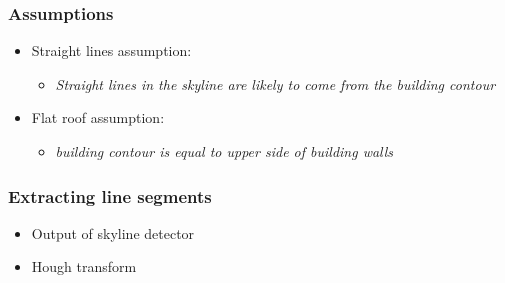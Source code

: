 \documentclass{beamer}
\begin{document}
\frame
{
	\frametitle{Assumptions}
	\begin{itemize}
		\item Straight lines assumption:
		\begin{itemize}
		\item \emph{Straight lines in the skyline are likely to come from the
		building contour}
		\end{itemize}
		\item Flat roof assumption:
		\begin{itemize}
		\item \emph{building contour is equal to upper side of building walls}
		\end{itemize}
	\end{itemize}
}

\frame
{
	\frametitle{Extracting line segments}
	\begin{itemize}
	\item <+-| alert@+> Output of skyline detector
	\item <+-| alert@+> Hough transform
	\end{itemize}


}
\end{document}
